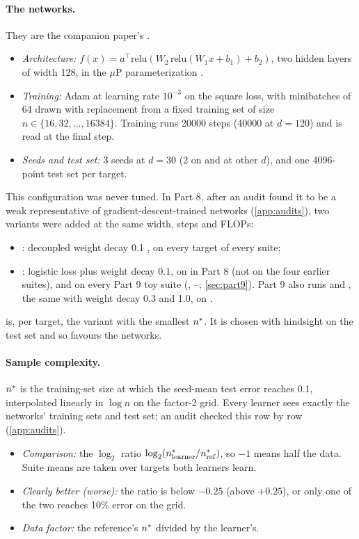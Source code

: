 \paragraph{The networks.} They are the companion paper's \cite{gdcircuit2026}.
\begin{itemize}
\item \emph{Architecture:} $f(x)=a^\top\mathrm{relu}(W_2\,\mathrm{relu}(W_1x+b_1)+b_2)$, two hidden layers of width 128, in the $\mu$P parameterization \cite{yang2021feature}.
\item \emph{Training:} Adam \cite{kingma2015adam} at learning rate $10^{-3}$ on the square loss, with minibatches of 64 drawn with replacement from a fixed training set of size $n\in\{16,32,\dots,16384\}$. Training runs 20000 steps (40000 at $d=120$) and is read at the final step.
\item \emph{Seeds and test set:} 3 seeds at $d=30$ (2 on  and at other $d$), and one 4096-point test set per target.
\end{itemize}
This configuration was never tuned. In Part 8, after an audit found it to be a weak representative of gradient-descent-trained networks (\cref{app:audits}), two variants were added at the same width, steps and FLOPs:
\begin{itemize}
\item {}: decoupled weight decay 0.1 \cite{loshchilov2019adamw}, on every target of every suite;
\item {}: logistic loss plus weight decay 0.1, on  in Part 8 (not on the four earlier suites), and on every Part 9 toy suite (, --; \cref{sec:part9}). Part 9 also runs  and , the same with weight decay 0.3 and 1.0, on .
\end{itemize}
 is, per target, the variant with the smallest $n^{*}$. It is chosen with hindsight on the test set and so favours the networks.

\paragraph{Sample complexity.} $n^{*}$ is the training-set size at which the seed-mean test error reaches 0.1, interpolated linearly in $\log n$ on the factor-2 grid. Every learner sees exactly the networks' training sets and test set; an audit checked this row by row (\cref{app:audits}).
\begin{itemize}
\item \emph{Comparison:} the $\log_2$ ratio $\log_2(n^{*}_{\rm learner}/n^{*}_{\rm ref})$, so $-1$ means half the data. Suite means are taken over targets both learners learn.
\item \emph{Clearly better (worse):} the ratio is below $-0.25$ (above $+0.25$), or only one of the two reaches 10\% error on the grid.
\item \emph{Data factor:} the reference's $n^{*}$ divided by the learner's.
\end{itemize}

